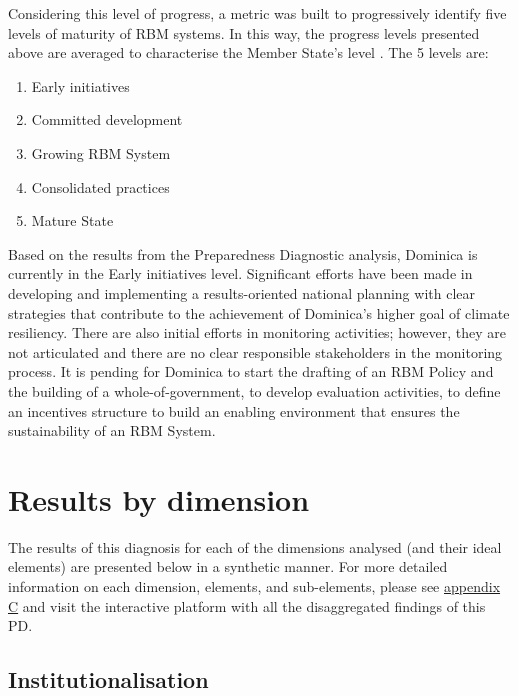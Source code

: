 \documentclass[
]{book}
\providecommand{\tightlist}{%
  \setlength{\itemsep}{0pt}\setlength{\parskip}{0pt}}
\begin{document}
Considering this level of progress, a metric was built to progressively identify five levels of maturity of RBM systems. In this way, the progress levels presented above are averaged to characterise the Member State's level . The 5 levels are:

\begin{enumerate}
\def\labelenumi{\arabic{enumi}.}
\tightlist
\item
  Early initiatives
\item
  Committed development
\item
  Growing RBM System
\item
  Consolidated practices
\item
  Mature State
\end{enumerate}

Based on the results from the Preparedness Diagnostic analysis, Dominica is currently in the Early initiatives level. Significant efforts have been made in developing and implementing a results-oriented national planning with clear strategies that contribute to the achievement of Dominica's higher goal of climate resiliency. There are also initial efforts in monitoring activities; however, they are not articulated and there are no clear responsible stakeholders in the monitoring process. It is pending for Dominica to start the drafting of an RBM Policy and the building of a whole-of-government, to develop evaluation activities, to define an incentives structure to build an enabling environment that ensures the sustainability of an RBM System.

\hypertarget{results-by-dimension}{%
\section{Results by dimension}\label{results-by-dimension}}

The results of this diagnosis for each of the dimensions analysed (and their ideal elements) are presented below in a synthetic manner. For more detailed information on each dimension, elements, and sub-elements, please see \protect\hyperlink{appendixC}{appendix C} and visit the interactive platform with all the disaggregated findings of this PD.

\hypertarget{institutionalisation}{%
\subsection{Institutionalisation}\label{institutionalisation}}
\end{document}
